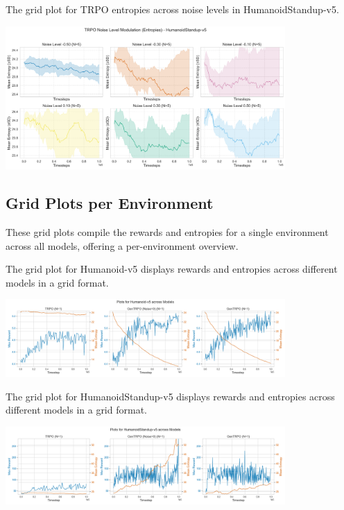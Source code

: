 \documentclass{svproc}
\begin{document}
The grid plot for TRPO entropies across noise levels in HumanoidStandup-v5.

\begin{center}
\includegraphics[width=0.8\textwidth]{graph_HumanoidStandup-v5_TRPO_noise_mod_entropies_grid.png}
\end{center}

\subsection{Grid Plots per Environment}
These grid plots compile the rewards and entropies for a single environment across all models, offering a per-environment overview.

The grid plot for Humanoid-v5 displays rewards and entropies across different models in a grid format.

\begin{center}
\includegraphics[width=0.8\textwidth]{grid_env_Humanoid-v5.png}
\end{center}

The grid plot for HumanoidStandup-v5 displays rewards and entropies across different models in a grid format.

\begin{center}
\includegraphics[width=0.8\textwidth]{grid_env_HumanoidStandup-v5.png}
\end{center}
\end{document}
